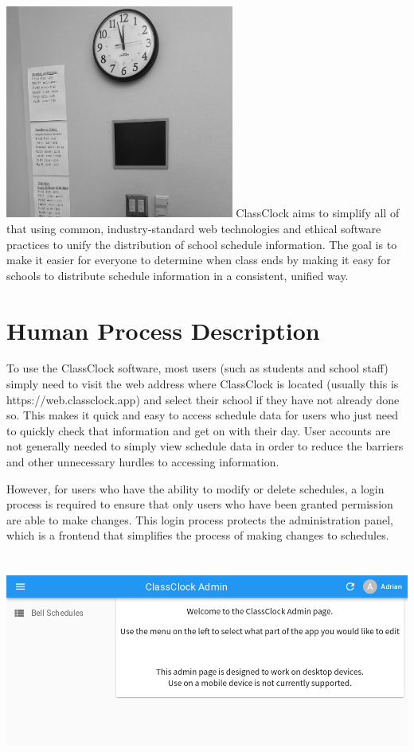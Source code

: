 \documentclass{article}
\begin{document}
\includegraphics[width=2.9547in,height=2.7646in]{Mini20Manual-img003.jpg}
{ClassClock aims to simplify all of that using common, industry-standard web technologies and ethical software practices
to unify the distribution of school schedule information. The goal is to make it easier for everyone to determine when
class ends by making it easy for schools to distribute schedule information in a consistent, unified way.}

\section{Human Process Description}
{To use the ClassClock software, most users (such as students and school staff) simply need to visit the web address
where ClassClock is located (usually this is https://web.classclock.app) and select their school if they have not
already done so. This makes it quick and easy to access schedule data for users who just need to quickly check that
information and get on with their day. User accounts are not generally needed to simply view schedule data in order to
reduce the barriers and other unnecessary hurdles to accessing information.}

{However, for users who have the ability to modify or delete schedules, a login process is required to ensure that only
users who have been granted permission are able to make changes. This login process protects the administration panel,
which is a frontend that simplifies the process of making changes to schedules.}



\includegraphics[width=6.5in,height=2.7626in]{Mini20Manual-img004.png}
\end{document}

